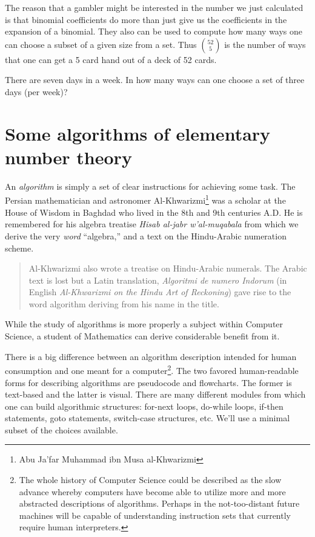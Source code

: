 The reason that a gambler might be interested in the number we just calculated
is that binomial coefficients do more than just give us the coefficients in the
expansion of a binomial.  They also can be used to compute how many ways one
can choose a subset of a given size from a set.  Thus $\binom{52}{5}$ is the
number of ways that one can get a 5 card hand out of a deck of 52 cards.  

\begin{exer}
There are seven days in a week.  In how many ways can one choose a set
of three days (per week)?
\end{exer}

\newpage




\newpage

\section[Some algorithms]{Some algorithms of elementary number theory}
\label{sec:alg}

An \emph{algorithm} is simply a set of clear 
instructions for achieving
some task.  The Persian mathematician and astronomer
Al-Khwarizmi\footnote{Abu Ja'far Muhammad ibn Musa al-Khwarizmi} was a
scholar at the House of Wisdom in Baghdad who lived in the 8th and 9th
centuries A.D.   He is remembered for his algebra treatise \emph{Hisab
  al-jabr w'al-muqabala} from which we derive the very {\em word}
``algebra,'' and a text on the Hindu-Arabic numeration scheme.

\begin{quote}
Al-Khwarizmi also wrote a treatise on Hindu-Arabic numerals. The
Arabic text is lost but a Latin translation, {\em Algoritmi de numero
Indorum} (in English {\em Al-Khwarizmi on the Hindu Art of Reckoning}) gave
rise to the word algorithm deriving from his name in the
title.~\cite{HisMathArch} 
\end{quote}

While the study of algorithms is more properly a subject within
Computer Science, a student of Mathematics can derive considerable
benefit from it.  

There is a big difference between an algorithm description intended
for human consumption and one meant for a computer\footnote{The 
whole history of Computer Science could be
  described as the slow advance whereby computers have become  able to
  utilize more and more abstracted descriptions of algorithms. 
  Perhaps in the not-too-distant future machines will be capable of
  understanding instruction sets that currently require human interpreters.}.  
The two favored human-readable forms for describing
algorithms are  pseudocode and  
flowcharts.  The former is text-based
and the latter is visual.  There are many different modules from which
one can build algorithmic structures: for-next loops, do-while loops, if-then
statements, goto statements, switch-case structures, etc.   We'll use
a minimal subset of the choices available.

